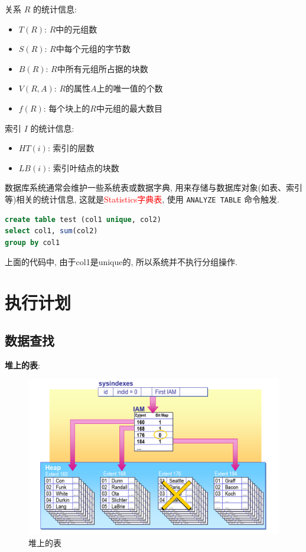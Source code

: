 关系 $R$ 的统计信息:
\begin{itemize}
    \item $T(R)$: $R$中的元组数
    \item $S(R)$: $R$中每个元组的字节数
    \item $B(R)$: $R$中所有元组所占据的块数
    \item $V(R, A)$: $R$的属性$A$上的唯一值的个数
    \item $f(R)$: 每个块上的$R$中元组的最大数目
\end{itemize}

索引 $I$ 的统计信息:
\begin{itemize}
    \item $HT(i)$: 索引的层数
    \item $LB(i)$: 索引叶结点的块数
\end{itemize}

数据库系统通常会维护一些系统表或数据字典, 用来存储与数据库对象(如表、索引等)相关的统计信息, 这就是\textcolor{red}{Statistics字典表}, 使用 \verb|ANALYZE TABLE| 命令触发.

\begin{lstlisting}[language=SQL, caption={基于规则的优化示例}]
create table test (col1 unique, col2)
select col1, sum(col2)
group by col1
\end{lstlisting}

上面的代码中, 由于col1是unique的, 所以系统并不执行分组操作.

\section{执行计划}

\subsection{数据查找}

\textbf{堆上的表}:

\begin{figure}[H]
    \centering
    \includegraphics[width=.7\textwidth]{figure/堆上的表.png}
    \caption{堆上的表}
\end{figure}

